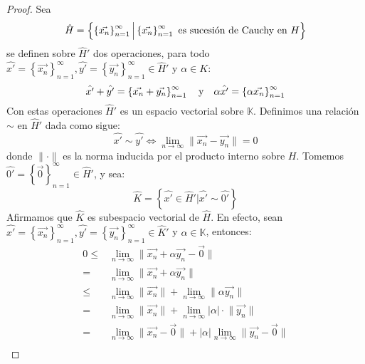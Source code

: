 \documentclass[12pt]{report}
\theoremstyle{largebreak}
\newcommand\abs[1]{\ensuremath{\big|#1\big|}}
\newcommand\norm[1]{\ensuremath{\|#1\|}}
\begin{document}
    \begin{proof}
        Sea
        \begin{equation*}
            \hat{H}=\left\{\left\{\vec{x_n} \right\}_{n=1}^\infty\Big|\left\{\vec{x_n} \right\}_{n=1}^\infty\textup{ es sucesión de Cauchy en }H \right\}
        \end{equation*}
        se definen sobre $\hat{H}'$ dos operaciones, para todo $\hat{x'}=\left\{\vec{x_n} \right\}_{n=1}^\infty,\hat{y'}=\left\{\vec{y_n} \right\}_{n=1}^\infty\in \hat{H}'$ y $\alpha\in K$:
        \begin{equation*}
            \hat{x'}+\hat{y'}=\left\{\vec{x_n}+\vec{y_n} \right\}_{n=1 }^\infty\quad\textup{y}\quad\alpha\hat{x'}=\left\{\alpha\vec{x_n} \right\}_{n=1 }^\infty
        \end{equation*}
        Con estas operaciones $\hat{H}'$ es un espacio vectorial sobre $\mathbb{K}$. Definimos una relación $\sim$ en $\hat{H}'$ dada como sigue:
        \begin{equation*}
            \hat{x'}\sim\hat{y'}\iff\lim_{n\rightarrow\infty }\norm{\vec{x_n}-\vec{y_n}}=0
        \end{equation*}
        donde $\norm{\cdot}$ es la norma inducida por el producto interno sobre $H$. Tomemos $\hat{0'}=\left\{\vec{0} \right\}_{ n=1}^\infty\in\hat{H}'$, y sea:
        \begin{equation*}
            \hat{K}=\left\{\hat{x'}\in\hat{H}'\Big|\hat{x'}\sim\hat{0'} \right\}
        \end{equation*}
        Afirmamos que $\hat{K}$ es subespacio vectorial de $\hat{H}$. En efecto, sean $\hat{x'}=\left\{\vec{x_n} \right\}_{n=1}^\infty,\hat{y'}=\left\{\vec{y_n} \right\}_{n=1}^\infty\in \hat{K}'$ y $\alpha\in\mathbb{K}$, entonces:
        \begin{equation*}
            \begin{split}
                0\leq&\lim_{n\rightarrow\infty}\norm{\vec{x_n}+\alpha\vec{y_n}-\vec{0}}\\
                =&\lim_{n\rightarrow\infty}\norm{\vec{x_n}+\alpha\vec{y_n}}\\
                \leq&\lim_{n\rightarrow\infty}\norm{\vec{x_n}}+\lim_{n\rightarrow\infty}\norm{\alpha\vec{y_n}}\\
                =&\lim_{n\rightarrow\infty}\norm{\vec{x_n}}+\lim_{n\rightarrow\infty}\abs{\alpha}\cdot\norm{\vec{y_n}}\\
                =&\lim_{n\rightarrow\infty}\norm{\vec{x_n}-\vec{0}}+\abs{\alpha}\lim_{n\rightarrow\infty}\norm{\vec{y_n}-\vec{0}}\\

\end{split}
\end{equation*}
\end{proof}
\end{document}
